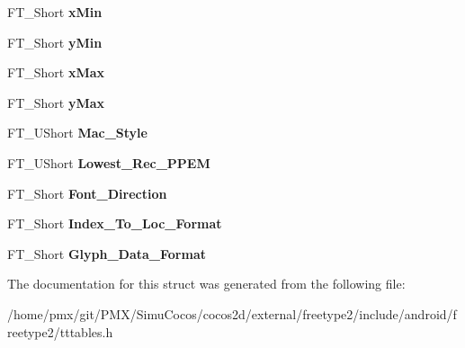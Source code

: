 \begin{DoxyCompactItemize}
F\+T\+\_\+\+Short {\bfseries x\+Min}
\item 
\mbox{\label{structTT__Header___ac6aad4966bac8a96c5bc48765b3d694a}} 
F\+T\+\_\+\+Short {\bfseries y\+Min}
\item 
\mbox{\label{structTT__Header___a593b9cc3e11532972a7fc96944dd1ae9}} 
F\+T\+\_\+\+Short {\bfseries x\+Max}
\item 
\mbox{\label{structTT__Header___a02d236cd8150c00e886a0c487c04dffa}} 
F\+T\+\_\+\+Short {\bfseries y\+Max}
\item 
\mbox{\label{structTT__Header___a82f2a5a836b802e44ff712b3afc8745c}} 
F\+T\+\_\+\+U\+Short {\bfseries Mac\+\_\+\+Style}
\item 
\mbox{\label{structTT__Header___a1d20801c3482dee2529d294441ed9af3}} 
F\+T\+\_\+\+U\+Short {\bfseries Lowest\+\_\+\+Rec\+\_\+\+P\+P\+EM}
\item 
\mbox{\label{structTT__Header___a1cb7d8a2a76ae1acda3ac94bcd555954}} 
F\+T\+\_\+\+Short {\bfseries Font\+\_\+\+Direction}
\item 
\mbox{\label{structTT__Header___a05a488607bfae319de096b4bd9cf8c6d}} 
F\+T\+\_\+\+Short {\bfseries Index\+\_\+\+To\+\_\+\+Loc\+\_\+\+Format}
\item 
\mbox{\label{structTT__Header___adeeedce4bb708c3e068ed80366ec921d}} 
F\+T\+\_\+\+Short {\bfseries Glyph\+\_\+\+Data\+\_\+\+Format}
\end{DoxyCompactItemize}


The documentation for this struct was generated from the following file\+:\begin{DoxyCompactItemize}
\item 
/home/pmx/git/\+P\+M\+X/\+Simu\+Cocos/cocos2d/external/freetype2/include/android/freetype2/tttables.\+h\end{DoxyCompactItemize}
